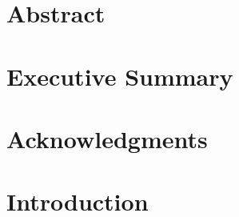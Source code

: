 \documentclass[12pt, oneside]{book}
\begin{document}

\chapter{Abstract}

\chapter{Executive Summary}


\chapter{Acknowledgments}


\tableofcontents

\listoffigures

\mainmatter

\chapter{Introduction}


\end{document}
